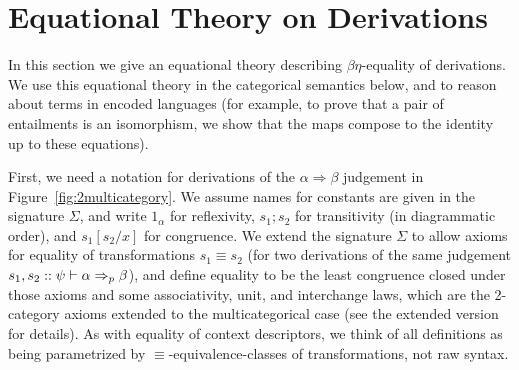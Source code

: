\documentclass[a4paper,USenglish,numberwithinsect]{lipics-v2016}
\newcommand\deq{\ensuremath{\equiv}}
\newcommand\spr{\ensuremath{\Rightarrow}} %
\begin{document}

\section{Equational Theory on Derivations}
\label{sec:equational}

In this section we give an equational theory describing $\beta\eta$-equality of
derivations.  We use this equational theory in the categorical semantics
below, and to reason about terms in encoded languages (for example, to
prove that a pair of entailments is an isomorphism, we show that the
maps compose to the identity up to these equations).

First, we need a notation for derivations of the $\alpha \spr \beta$
judgement in Figure~\ref{fig:2multicategory}.  We assume names for
constants are given in the signature $\Sigma$, and write $1_\alpha$ for
reflexivity, $s_1;s_2$ for transitivity (in diagrammatic order), and
$s_1[s_2/x]$ for congruence.  We extend the signature $\Sigma$ to allow
axioms for equality of transformations $s_1 \deq s_2$ (for two
derivations of the same judgement $s_1,s_2 ::
\wfsp{\psi}{\alpha}{\beta}{p}$), and define equality to be the least
congruence closed under those axioms and some associativity, unit, and
interchange laws, which are the 2-category axioms extended to the
multicategorical case (see the extended version for details).  As with
equality of context descriptors, we think of all definitions as being
parametrized by \deq-equivalence-classes of transformations, not raw
syntax.
\end{document}
